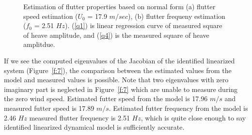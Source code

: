 \documentclass[openacc]{rsproca_new}%
\newcommand{\Fref}[1]{Figure~\ref{#1}}
\begin{document}
\begin{figure}
  \centering
\caption{Estimation of flutter properties based on normal form (a) flutter speed estimation ($U_0$ = 17.9 $m/sec$), (b) flutter frequeny estimation ($f_0$ = 2.51 $Hz$). (\ref{q1}) is linear regression curve of measured square of heave amplitude, and (\ref{q4}) is the measured square of heave amplitdue.}
\label{f:6}
\end{figure}

If we see the computed eigenvalues of the Jacobian of the identified linearized system (\Fref{f:7}), the comparison between the estimated values from the model and measured values is possible. Note that two eigenvalues with zero imaginary part is neglected in \Fref{f:7} which are unable to measure during the zero wind speed. Estimated futter speed from the model is 17.96 $m/s$ and measured futter speed is 17.89 $m/s$. Estimated futter frequency from the model is 2.46 $Hz$ measured flutter frequency is 2.51 $Hz$, which is quite close enough to say identified linearized dynamical model is sufficiently accurate.
\end{document}
